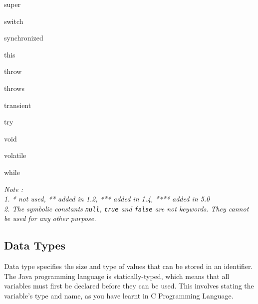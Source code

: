 \documentclass[11pt,a4paper]{article}
\begin{document}
\begin{multicols}{4}
 \begin{description}  
  \item super
  \item switch
  \item synchronized
  \item this
  \item throw
  \item throws
  \item transient
  \item try
  \item void
  \item volatile
  \item while
  \item
  \item
  \end{description}
   \end{multicols}
  
   \emph{Note : \\ 1. * not used, ** added in 1.2, *** added in 1.4, **** added in 5.0 \\
   2. The symbolic constants \lstinline!null!, \lstinline!true! and \lstinline!false! are not keywords. They cannot be used for any other purpose.}

\subsection*{Data Types}
Data type specifies the size and type of values that can be stored in an identifier. The Java programming language is statically-typed, which means that all variables must first be declared before they can be used. This involves stating the variable's type and name, as you have learnt in C Programming Language.
\end{document}
